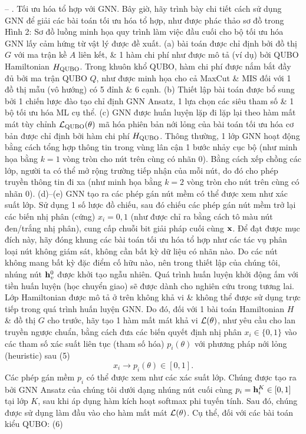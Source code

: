 \documentclass{article}
\begin{document}
\begin{itemize}
    -- {. Tối ưu hóa tổ hợp với GNN.} Bây giờ, hãy trình bày chi tiết cách sử dụng GNN để giải các bài toán tối ưu hóa tổ hợp, như được phác thảo sơ đồ trong {\sf Hình 2: Sơ đồ luồng minh họa quy trình làm việc đầu cuối cho bộ tối ưu hóa GNN lấy cảm hứng từ vật lý được đề xuất. (a) bài toán được chỉ định bởi đồ thị $G$ với ma trận kề $A$ liên kết, \& 1 hàm chi phí như được mô tả (ví dụ) bởi QUBO Hamiltonian $H_{\rm QUBO}$. Trong khuôn khổ QUBO, hàm chi phí được nắm bắt đầy đủ bởi ma trận QUBO $Q$, như được minh họa cho cả MaxCut \& MIS đối với 1 đồ thị mẫu (vô hướng) có 5 đỉnh \& 6 cạnh. (b) Thiết lập bài toán được bổ sung bởi 1 chiến lược đào tạo chỉ định GNN Ansatz, 1 lựa chọn các siêu tham số \& 1 bộ tối ưu hóa ML cụ thể. (c) GNN được huấn luyện lặp đi lặp lại theo hàm mất mát tùy chỉnh ${\cal L}_{\rm QUBO}(\theta)$ mã hóa phiên bản nới lỏng của bài toán tối ưu hóa cơ bản được chỉ định bởi hàm chi phí $H_{\rm QUBO}$. Thông thường, 1 lớp GNN hoạt động bằng cách tổng hợp thông tin trong vùng lân cận 1 bước nhảy cục bộ (như minh họa bằng $k = 1$ vòng tròn cho nút trên cùng có nhãn 0). Bằng cách xếp chồng các lớp, người ta có thể mở rộng trường tiếp nhận của mỗi nút, do đó cho phép truyền thông tin đi xa (như minh họa bằng $k = 2$ vòng tròn cho nút trên cùng có nhãn 0). (d)--(e) GNN tạo ra các phép gán nút mềm có thể được xem như xác suất lớp. Sử dụng 1 số lược đồ chiếu, sau đó chiếu các phép gán nút mềm trở lại các biến nhị phân (cứng) $x_i = 0,1$ (như được chỉ ra bằng cách tô màu nút đen/trắng nhị phân), cung cấp chuỗi bit giải pháp cuối cùng ${\bf x}$.} Để đạt được mục đích này, hãy đóng khung các bài toán tối ưu hóa tổ hợp như các tác vụ phân loại nút không giám sát, không cần bất kỳ dữ liệu có nhãn nào. Do các nút không mang bất kỳ đặc điểm cố hữu nào, nên trong thiết lập của chúng tôi, nhúng nút ${\bf h}_v^0$ được khởi tạo ngẫu nhiên. Quá trình huấn luyện khởi động ấm với tiền huấn luyện (học chuyển giao) sẽ được dành cho nghiên cứu trong tương lai. Lớp Hamiltonian được mô tả ở trên không khả vi \& không thể được sử dụng trực tiếp trong quá trình huấn luyện GNN. Do đó, đối với 1 bài toán Hamiltonian $H$ \& đồ thị $G$ cho trước, hãy tạo 1 hàm mất mát khả vi ${\cal L}(\theta)$, như yêu cầu cho lan truyền ngược chuẩn, bằng cách đưa các biến quyết định nhị phân $x_i\in\{0,1\}$ vào các tham số xác suất liên tục (tham số hóa) $p_i(\theta)$ với phương pháp nới lỏng (heuristic) sau (5)
    \begin{equation*}
        x_i\to p_i(\theta)\in[0,1].
    \end{equation*}
    Các phép gán mềm $p_i$ có thể được xem như các xác suất lớp. Chúng được tạo ra bởi GNN Ansatz của chúng tôi dưới dạng nhúng nút cuối cùng $p_i = {\bf h}_i^K\in[0,1]$ tại lớp $K$, sau khi áp dụng hàm kích hoạt softmax phi tuyến tính. Sau đó, chúng được sử dụng làm đầu vào cho hàm mất mát ${\cal L}(\theta)$. Cụ thể, đối với các bài toán kiểu QUBO: (6)

\end{itemize}
\end{document}
